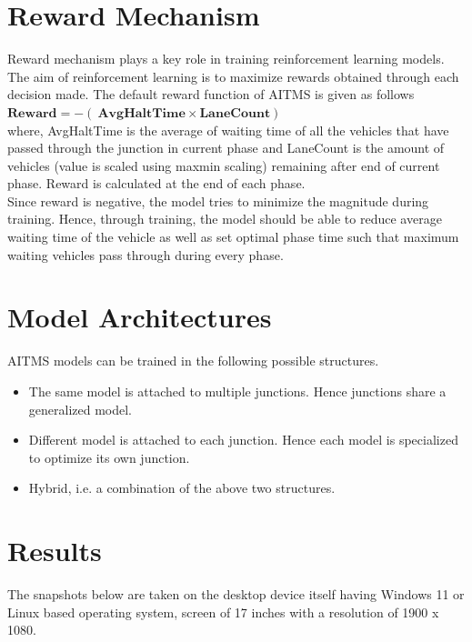 \documentclass[openany,12pt]{report}
\begin{document}
		\section{Reward Mechanism}
		\hspace*{0.5 in}Reward mechanism plays a key role in training reinforcement learning models. The aim of reinforcement learning is to maximize rewards obtained through each decision made. The default reward function of AITMS is given as follows\\ 
		\hspace*{1 in}$\mathbf{Reward = - (\ AvgHaltTime \times LaneCount )\ }$\\
		where, AvgHaltTime is the average of waiting time of all the vehicles that have passed through the junction in current phase and LaneCount is the amount of vehicles (value is scaled using maxmin scaling) remaining after end of current phase. Reward is calculated at the end of each phase.\\
		\hspace*{0.5 in} Since reward is negative, the model tries to minimize the magnitude during training. Hence, through training, the model should be able to reduce average waiting time of the vehicle as well as set optimal phase time such that maximum waiting vehicles pass through during every phase.\\
		\section{Model Architectures}
		\hspace*{0.5 in} AITMS models can be trained in the following possible structures.
		\begin{itemize}
			\item{The same model is attached to multiple junctions. Hence junctions share a generalized model.}
			\item{Different model is attached to each junction. Hence each model is specialized to optimize its own junction.}
			\item{Hybrid, i.e. a combination of the above two structures.}
		\end{itemize}
		\newpage
		\section{Results}
		\hspace*{0.5in}The snapshots below are taken on the desktop device itself having Windows 11 or Linux based operating system, screen of 17 inches with a resolution of 1900 x 1080.\\
		
\end{document}
